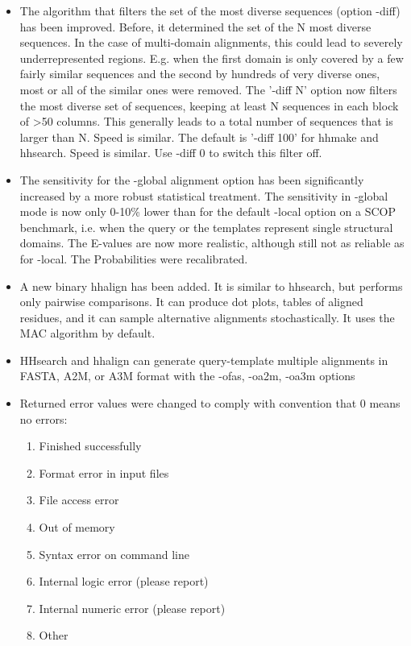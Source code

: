 \documentclass[11pt,a4paper]{article}
\begin{document}
\begin{itemize}
\item{The algorithm that filters the set of the most diverse sequences (option 
  -diff) has been improved. Before, it determined the set of the N most 
  diverse sequences. In the case of multi-domain alignments, this could lead 
  to severely underrepresented regions. E.g. when the first domain is only 
  covered by a few fairly similar sequences and the second by hundreds of very 
  diverse ones, most or all of the similar ones were removed. The '-diff N' 
  option now filters the most diverse set of sequences, keeping at least N 
  sequences in each block of >50 columns. This generally leads to a total 
  number of sequences that is larger than N. Speed is similar. The default
  is '-diff 100' for hhmake and hhsearch. Speed is similar. Use -diff 0 to 
  switch this filter off.
}
\item{The sensitivity for the -global alignment option has been significantly 
  increased by a more robust statistical treatment. The sensitivity in -global
  mode is now only 0-10\% lower than for the default -local option on a SCOP
  benchmark, i.e. when the query or the templates represent single structural 
  domains. The E-values are now more realistic, although still not as 
  reliable as for -local. The Probabilities were recalibrated.
}
\item{A new binary hhalign has been added. It is similar to hhsearch, but performs
  only pairwise comparisons. It can produce dot plots, tables of aligned 
  residues, and it can sample alternative alignments stochastically. It uses 
  the MAC algorithm by default. 
}
\item{HHsearch and hhalign can generate query-template multiple alignments in 
  FASTA, A2M, or A3M format with the -ofas, -oa2m, -oa3m options 
}
\item{Returned error values were changed to comply with convention that 0 means no errors:
\begin{enumerate}
   \item{Finished successfully}
   \item{Format error in input files}
   \item{File access error}
   \item{Out of memory }
   \item{Syntax error on command line}
   \item{Internal logic error (please report)}
   \item{Internal numeric error (please report)}
   \item{Other}
\end{enumerate}
}	


\end{itemize}
\end{document}
